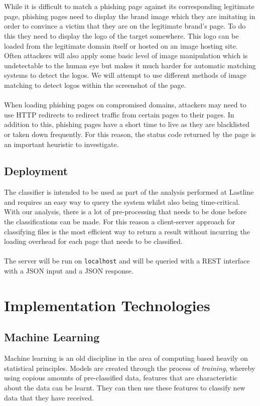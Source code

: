 \documentclass[12pt,twoside]{report}
\begin{document}
\\\\
While it is difficult to match a phishing page against its corresponding legitimate page, phishing pages need to display the brand image which they are imitating in order to convince a victim that they are on the legitimate brand's page. To do this they need to display the logo of the target somewhere. This logo can be loaded from the legitimate domain itself or hosted on an image hosting site. Often attackers will also apply some basic level of image manipulation which is undetectable to the human eye but makes it much harder for automatic matching systems to detect the logos. We will attempt to use different methods of image matching to  detect logos within the screenshot of the page.
\\\\
When loading phishing pages on compromised domains, attackers may need to use HTTP redirects to redirect traffic from certain pages to their pages. In addition to this, phishing pages have a short time to live as they are blacklisted or taken down frequently. For this reason, the status code returned by the page is an important heuristic to investigate.
\section{Deployment}
The classifier is intended to be used as part of the analysis performed at Lastline and requires an easy way to query the system whilst also being time-critical. With our analysis, there is a lot of pre-processing that needs to be done before the classifications can be made. For this reason a client-server approach for classifying files is the most efficient way to return a result without incurring the loading overhead for each page that needs to be classified.
\\\\
The server will be run on \texttt{localhost} and will be queried with a REST interface with a JSON input and a JSON response.
\chapter{Implementation Technologies}
\section{Machine Learning}
Machine learning is an old discipline in the area of computing based heavily on statistical principles. Models are created through the process of \textit{training}, whereby using copious amounts of pre-classified data, features that are characteristic about the data can be learnt. They can then use these features to classify new data that they have received. 
\end{document}
